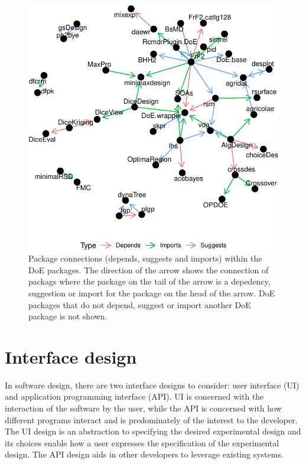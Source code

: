 \documentclass{article}
\begin{document}
\begin{figure}[htbp]

{\centering \includegraphics{figures/plot-doe-network-1} 

}

\caption{Package connections (depends, suggests and imports) within the DoE packages. The direction of the arrow shows the connection of packags where the package on the tail of the arrow is a depedency, suggestion or import for the package on the head of the arrow.  DoE packages that do not depend, suggest or import another DoE package is not shown.}\label{fig:plot-doe-network}
\end{figure}

\hypertarget{design}{%
\section{Interface design}\label{design}}

In software design, there are two interface designs to consider: user
interface (UI) and application programming interface (API). UI is
concerned with the interaction of the software by the user, while the
API is concerned with how different programs interact and is
predominately of the interest to the developer. The UI design is an
abstraction to specifying the desired experimental design and its
choices enable how a user expresses the specification of the
experimental design. The API design aids in other developers to leverage
existing systems.
\end{document}
